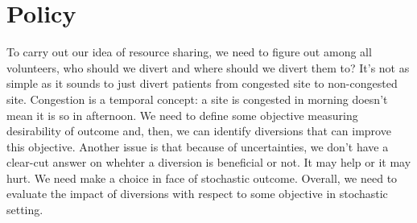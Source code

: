\section{Policy}

To carry out our idea of resource sharing, we need to figure out among all volunteers, who should we divert and where should we divert them to? It's not as simple as it sounds to just divert patients from congested site to non-congested site. Congestion is a temporal concept: a site is congested in morning doesn't mean it is so in afternoon. We need to define some objective measuring desirability of outcome and, then, we can identify diversions that can improve this objective. Another issue is that because of uncertainties, we don't have a clear-cut answer on whehter a diversion is beneficial or not. It may help or it may hurt. We need make a choice in face of stochastic outcome. Overall, we need to evaluate the impact of diversions with respect to some objective in stochastic setting.




